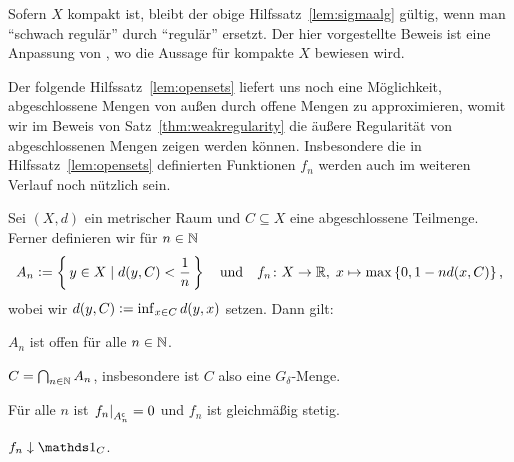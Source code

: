 \documentclass[../main/main.tex]{subfiles}
\begin{document}
	\begin{Bemerkung}
		Sofern $X$ kompakt ist, bleibt der obige Hilfssatz~\ref{lem:sigmaalg} gültig, wenn man \enquote{schwach regulär} durch \enquote{regulär} ersetzt. Der hier vorgestellte Beweis ist eine Anpassung von \cite[Lemma 4.5.5]{Simon.2015}, wo die Aussage für kompakte $X$ bewiesen wird.
	\end{Bemerkung}

	Der folgende Hilfssatz~\ref{lem:opensets} liefert uns noch eine Möglichkeit, 
	abgeschlossene Mengen von außen durch offene Mengen zu approximieren, womit wir im 
	Beweis von Satz~\ref{thm:weakregularity} die äußere Regularität von abgeschlossenen 
	Mengen zeigen werden können. Insbesondere die in Hilfssatz~\ref{lem:opensets} definierten 
	Funktionen $f_n$ werden  auch im weiteren Verlauf noch nützlich sein.
	
	\begin{Hilfssatz}
		\label{lem:opensets}
		Sei $(X, d)$ ein metrischer Raum und $C \subseteq X$ eine abgeschlossene 
		Teilmenge. Ferner definieren wir für $n \in \mathbb{N}$
		$$ A_n \vcentcolon = \left\{\, y \in X \; | \; d(y, C) < \frac{1}{n} \,\right\} \quad \text{und} \quad 
		f_n \colon X \to \mathbb{R}, \; x \mapsto \max \left\{0, 1-n d(x, C)\right\}  \text{,}$$
		wobei wir $d(y, C) \vcentcolon = \inf_{x \in C} d(y, x)$ setzen.
		Dann gilt:
		\begin{enumeratethm}
			\item $A_n$ ist offen für alle $n \in \mathbb{N}$.
			\item $C = \bigcap_{n \in \mathbb{N}} A_n$, insbesondere ist $C$ also eine $G_\delta$-Menge.
			\item Für alle $n$ ist $\left.f_n\right|_{A_n^\mathsf{c}} = 0$ und $f_n$ ist gleichmäßig stetig.
			\item $f_n \convdown \indfct_C$.
		\end{enumeratethm}
	\end{Hilfssatz}
\end{document}
